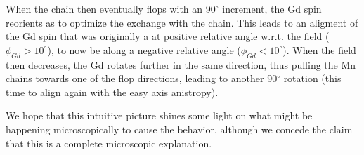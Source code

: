 When the chain then eventually flops with an 90$^\circ$ increment, the Gd spin reorients as to optimize the exchange with the chain.
This leads to an aligment of the Gd spin that was originally a at positive relative angle w.r.t. the field ($\phi_{Gd}>10^\circ$), to now be along a negative relative angle ($\phi_{Gd}<10^\circ$).
When the field then decreases, the Gd rotates further in the same direction, thus pulling the Mn chains towards one of the flop directions, leading to another 90$^\circ$ rotation (this time to align again with the easy axis anistropy).

%
We hope that this intuitive picture shines some light on what might be happening microscopically to cause the behavior, although we concede the claim that this is a complete microscopic explanation.

